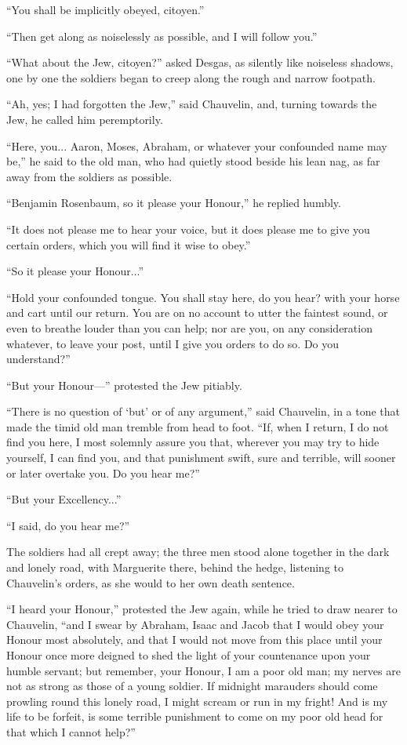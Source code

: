 \documentclass[paper=a5,BCOR=7mm,twoside,DIV=calc,12pt,usegeometry,chapterprefix,endperiod,headings=big]{scrbook}
\begin{document}
\enquote{You shall be implicitly obeyed, citoyen.}

\enquote{Then get along as noiselessly as possible, and I will follow you.}

\enquote{What about the Jew, citoyen?} asked Desgas, as silently like noiseless shadows, one by one the soldiers began to creep along the rough and narrow footpath.

\enquote{Ah, yes; I had forgotten the Jew,} said Chauvelin, and, turning towards the Jew, he called him peremptorily.

\enquote{Here, you... Aaron, Moses, Abraham, or whatever your confounded name may be,} he said to the old man, who had quietly stood beside his lean nag, as far away from the soldiers as possible.

\enquote{Benjamin Rosenbaum, so it please your Honour,} he replied humbly.

\enquote{It does not please me to hear your voice, but it does please me to give you certain orders, which you will find it wise to obey.}

\enquote{So it please your Honour...}

\enquote{Hold your confounded tongue. You shall stay here, do you hear? with your horse and cart until our return. You are on no account to utter the faintest sound, or even to breathe louder than you can help; nor are you, on any consideration whatever, to leave your post, until I give you orders to do so. Do you understand?}

\enquote{But your Honour---} protested the Jew pitiably.

\enquote{There is no question of \enquote{but} or of any argument,} said Chauvelin, in a tone that made the timid old man tremble from head to foot. \enquote{If, when I return, I do not find you here, I most solemnly assure you that, wherever you may try to hide yourself, I can find you, and that punishment swift, sure and terrible, will sooner or later overtake you. Do you hear me?}

\enquote{But your Excellency...}

\enquote{I said, do you hear me?}

The soldiers had all crept away; the three men stood alone together in the dark and lonely road, with Marguerite there, behind the hedge, listening to Chauvelin's orders, as she would to her own death sentence.

\enquote{I heard your Honour,} protested the Jew again, while he tried to draw nearer to Chauvelin, \enquote{and I swear by Abraham, Isaac and Jacob that I would obey your Honour most absolutely, and that I would not move from this place until your Honour once more deigned to shed the light of your countenance upon your humble servant; but remember, your Honour, I am a poor old man; my nerves are not as strong as those of a young soldier. If midnight marauders should come prowling round this lonely road, I might scream or run in my fright! And is my life to be forfeit, is some terrible punishment to come on my poor old head for that which I cannot help?}
\end{document}
